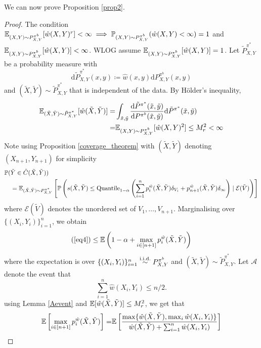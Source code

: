 We can now prove Proposition \ref{prop2}.
\begin{proof}
The condition $\mathbb{E}_{(X,Y)\sim P^{\pi^b}_{X,Y}}[\hat{w}(X, Y)^r] < \infty \implies \mathbb{P}_{(X,Y)\sim P^{\pi^b}_{X,Y}}(\hat{w}(X, Y)< \infty) = 1$ and $\mathbb{E}_{(X,Y)\sim P^{\pi^b}_{X,Y}}[\hat{w}(X, Y)]<\infty$. WLOG assume $\mathbb{E}_{(X,Y)\sim P^{\pi^b}_{X,Y}}[\hat{w}(X, Y)] = 1$. Let $\tilde{P}^{\pi^*}_{X, Y}$ be a probability measure with 
\[
    \mathrm{d}\tilde{P}^{\pi^*}_{X, Y}(x,y) \coloneqq \hat{w}(x,y) \mathrm{d}P^{\pi^b}_{X, Y}(x,y)
\]
and $(\tilde{X}, \tilde{Y}) \sim \tilde{P}^{\pi^*}_{X,Y}$ that is independent of the data. By H\"older's inequality, 
\begin{align}
    \mathbb{E}_{(\tilde{X},\tilde{Y})\sim \tilde{P}^{\pi^*}_{X,Y}}[\hat{w}(\tilde{X}, \tilde{Y})] =& \int_{\tilde{x}, \tilde{y}} \frac{\mathrm{d}\tilde{P}^{\pi^*}(\tilde{x}, \tilde{y})}{\mathrm{d}P^{\pi^b}(\tilde{x}, \tilde{y})}\mathrm{d}\tilde{P}^{\pi^*}(\tilde{x}, \tilde{y}) \nonumber \\
    =& \mathbb{E}_{(X,Y)\sim P^{\pi^b}_{X,Y}}[\hat{w}(X, Y)^2] \leq M_r^2 < \infty \nonumber 
\end{align}
Note using Proposition \ref{coverage_theorem} with $(\tilde{X}, \tilde{Y})$ denoting $(X_{n+1}, Y_{n+1})$ for simplicity 
\begin{align}
    &\mathbb{P}(\tilde{Y} \in \hat{C}(\tilde{X}, \tilde{Y})) \nonumber \\
    &\quad= \mathbb{E}_{(\tilde{X},\tilde{Y})\sim P^{\pi^*}_{X,Y}} \left[\mathbb{P}\left(s(\tilde{X}, \tilde{Y}) \leq \text{Quantile}_{1-\alpha}\left(\sum_{i=1}^n p_i^{\hat{w}}(\tilde{X}, \tilde{Y})\delta_{V_i} + p_{n+1}^{\hat{w}}(\tilde{X}, \tilde{Y})\delta_\infty \right)\mid \mathcal{E}(\tilde{V})\right)\right] \label{eq4}
\end{align}
where $\mathcal{E}(\tilde{V})$ denotes the unordered set of $V_1, \dots, V_{n+1}$. Marginalising over $\{(X_i, Y_i)\}_{i=1}^n$, we obtain
%
%
%
\begin{align}
    (\ref{eq4}) \leq \mathbb{E}\left(1-\alpha + \max_{i \in [n+1]} p_i^{\hat{w}}(\tilde{X}, \tilde{Y}) \right) \label{eq5}
\end{align}
where the expectation is over $\{(X_i, Y_i)\}_{i=1}^n \overset{\textup{i.i.d.}}{\sim} P^{\pi^b}_{X, Y}$ and $(\tilde{X}, \tilde{Y}) \sim \tilde{P}^{\pi^*}_{X, Y}$. Let $\mathcal{A}$ denote the event that 
\[
\sum_{i=1}^n \hat{w}(X_i, Y_i) \leq n/2.
\]
using Lemma \ref{Aevent} and $\mathbb{E}[\hat{w}(\tilde{X}, \tilde{Y})] \leq M_r^2 $, we get that
%
%
%
%
%
%
%
%
%
\begin{align}
    \E\left[\max_{i \in [n+1]} p_i^{\hat{w}}(\tilde{X}, \tilde{Y})\right] =& \E\left[ \frac{\max \{\hat{w}(\tilde{X}, \tilde{Y}), \max_i \hat{w}(X_i, Y_i) \}}{\hat{w}(\tilde{X}, \tilde{Y}) + \sum_{i=1}^n \hat{w}(X_i, Y_i) } \right] \nonumber \\

\end{align}
\end{proof}

